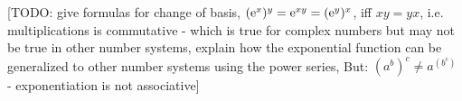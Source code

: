 
[TODO: give formulas for change of basis, $(\operatorname{\mathrm{e}}^x)^y = \operatorname{\mathrm{e}}^{x y} = (\operatorname{\mathrm{e}}^y)^x$, iff $xy = yx$, i.e. multiplications is commutative - which is true for complex numbers but may not be true in other number systems, explain how the exponential function can be generalized to other number systems using the power series, But: $(a^b)^c \neq a^{(b^c)}$ - exponentiation is not associative]












